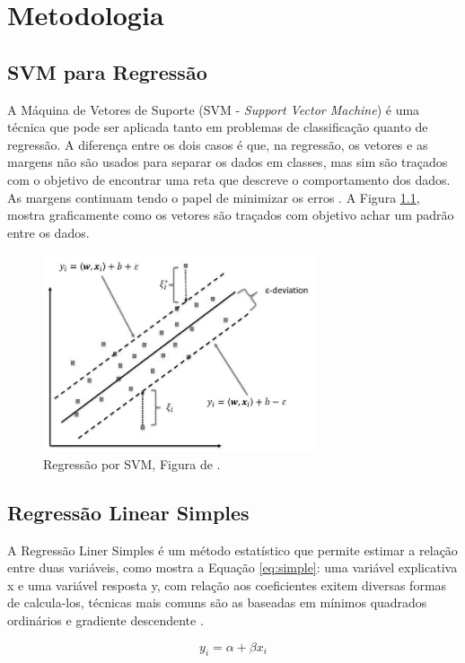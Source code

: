 \chapter{Metodologia}

\section{SVM para Regressão}
A Máquina de Vetores de Suporte (SVM - \textit{Support Vector Machine})
é uma técnica que pode ser aplicada tanto em problemas de classificação quanto de
regressão. A diferença entre os dois casos é que, na regressão, os vetores e as
margens não são usados para separar os dados em classes, mas sim são traçados com o 
objetivo de encontrar uma reta que descreve o comportamento dos dados. As margens
continuam tendo o papel de minimizar os erros \cite{noronha2016implementaccao}. A Figura 
\ref{fig:SVM_1}, mostra graficamente como os vetores são traçados com objetivo achar um padrão 
entre os dados. 

\begin{figure}[h]
  \centering
  \includegraphics[width=8cm]{figuras/SVM/SVM_1.png}
  \caption{Regressão por SVM, Figura de \cite{Coutinho_2020}.}
  \label{fig:SVM_1}
\end{figure}

\section{Regressão Linear Simples}

A Regressão Liner Simples é um método estatístico que permite estimar a relação entre
duas variáveis, como mostra a Equação \ref{eq:simple}: uma variável explicativa x e uma
variável resposta y, com relação aos coeficientes exitem diversas formas de calcula-los,
técnicas mais comuns são as baseadas em mínimos quadrados ordinários e gradiente descendente
\cite{Almeida_Carvalho_Menino}.

\begin{equation}
  y_{i} = \alpha + \beta x_{i}
  \label{eq:simple}
\end{equation}

